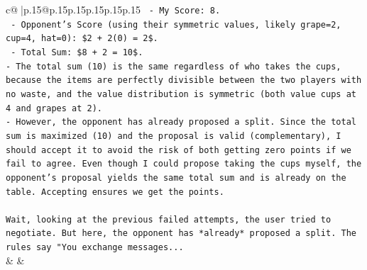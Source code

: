 \documentclass{article}
\begin{document}
{\begin{supertabular}{c@{$\;$}|p{.15\linewidth}@{}p{.15\linewidth}p{.15\linewidth}p{.15\linewidth}p{.15\linewidth}p{.15\linewidth}}
{{{\texttt{  {-} My Score: 8.} \\
\texttt{  {-} Opponent's Score (using their symmetric values, likely grape=2, cup=4, hat=0): \$2 + 2(0) = 2\$.} \\
\texttt{  {-} Total Sum: \$8 + 2 = 10\$.} \\
\texttt{{-} The total sum (10) is the same regardless of who takes the cups, because the items are perfectly divisible between the two players with no waste, and the value distribution is symmetric (both value cups at 4 and grapes at 2).} \\
\texttt{{-} However, the opponent has already proposed a split. Since the total sum is maximized (10) and the proposal is valid (complementary), I should accept it to avoid the risk of both getting zero points if we fail to agree. Even though I could propose taking the cups myself, the opponent's proposal yields the same total sum and is already on the table. Accepting ensures we get the points.} \\
\\ 
\texttt{Wait, looking at the previous failed attempts, the user tried to negotiate. But here, the opponent has *already* proposed a split. The rules say "You exchange messages...} \\
            }
        }
    }
    & & \\ \\


\end{supertabular}}
\end{document}
